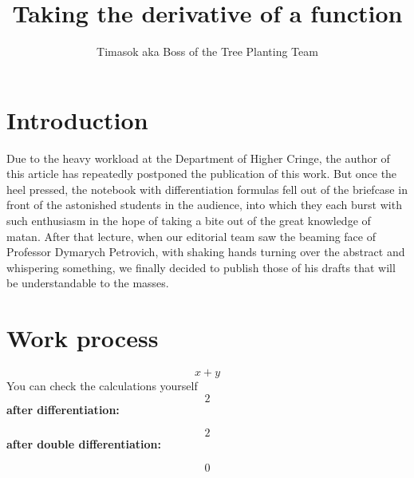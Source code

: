 \documentclass{article}
\title{\textbf{Taking the derivative of a function}}
\author{Timasok aka Boss of the Tree Planting Team}
\begin{document}
\maketitle
\section{Introduction}
Due to the heavy workload at the Department of Higher Cringe, the author of this article has repeatedly postponed the publication of this work. But once the heel pressed, the notebook with differentiation formulas fell out of the briefcase in front of the astonished students in the audience, into which they each burst with such enthusiasm in the hope of taking a bite out of the great knowledge of matan. After that lecture, when our editorial team saw the beaming face of Professor Dymarych Petrovich, with shaking hands turning over the abstract and whispering something, we finally decided to publish those of his drafts that will be understandable to the masses. \section{Work process}

$$
x+y
$$
You can check the calculations yourself
$$
2
$$
\textbf{after differentiation:}

$$
2
$$
\textbf{after double differentiation:}

$$
0
$$
\end{document}
